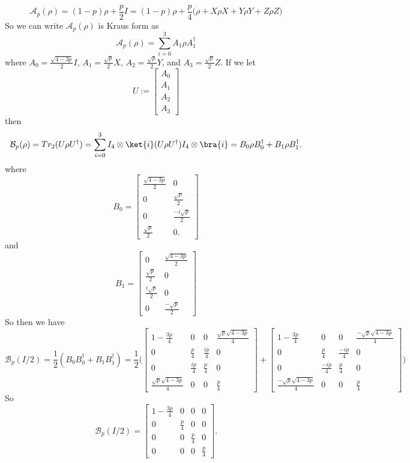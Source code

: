 \documentclass[letterpaper,12pt,oneside,onecolumn]{article}
\newcommand{\cA}{\mathcal{A}} \newcommand{\cB}{\mathcal{B}}
\begin{document}
\paragraph{}
$$\cA_p(\rho) = (1-p)\rho + \frac{p}{2}I  = (1-p)\rho + \frac{p}{4}\big( \rho + X\rho X + Y\rho Y + Z \rho Z\big)$$
So we can write $\cA_p(\rho)$ is Kraus form as
$$\cA_p(\rho)= \sum_{i=0}^3 A_1 \rho A_1^\dagger$$
where $A_0 = \frac{\sqrt{4-3p}}{2}I$, $A_1 = \frac{\sqrt{p}}{2}X$, $A_2= \frac{\sqrt{p}}{2}Y$, and $A_3 = \frac{\sqrt{p}}{2}Z$. If we let 
$$U := \begin{bmatrix}
A_0\\ A_1 \\ A_2\\ A_3
\end{bmatrix}$$
then 
$$\cB_p(\rho) = Tr_2(U\rho U^\dagger) = \sum_{i=0}^3I_4 \otimes \ket{i}(U\rho U^\dagger)I_4\otimes\bra{i} = B_0 \rho B_0^\dagger + B_1\rho B_1^\dagger.$$
where
$$B_0 = \begin{bmatrix}
\frac{\sqrt{4-3p}}{2} & 0 \\
0 & \frac{\sqrt{p}}{2} \\
0 & \frac{-i\sqrt{p}}{2} \\
\frac{\sqrt{p}}{2} & 0.
\end{bmatrix}$$
and
$$B_1 = \begin{bmatrix}
0 & \frac{\sqrt{4-3p}}{2} \\
\frac{\sqrt{p}}{2} & 0 \\
\frac{i\sqrt{p}}{2} & 0 \\
0 & \frac{-\sqrt{p}}{2}
\end{bmatrix}$$
So then we have
$$\cB_p(I/2) = \frac{1}{2}(B_0 B_0^\dagger + B_1 B_1^\dagger) = \frac{1}{2}\big(\begin{bmatrix}
1-\frac{3p}{4} & 0 & 0 & \frac{\sqrt{p}\sqrt{4-3p}}{4} \\
0 & \frac{p}{4} & \frac{ip}{4} & 0 \\
0 & \frac{ip}{4} & \frac{p}{4} & 0 \\
 \frac{\sqrt{p}\sqrt{4-3p}}{4} & 0 & 0 & \frac{p}{4}
\end{bmatrix} + \begin{bmatrix}
1-\frac{3p}{4} & 0 & 0 & \frac{-\sqrt{p}\sqrt{4-3p}}{4} \\
0 &  \frac{p}{4} & \frac{-ip}{4} & 0 \\
0 & \frac{-ip}{4} & \frac{p}{4} & 0 \\
\frac{-\sqrt{p}\sqrt{4-3p}}{4} & 0 & 0 & \frac{p}{4}
\end{bmatrix}\big)$$
So
$$\cB_p(I/2) = \begin{bmatrix}
1-\frac{3p}{4} & 0 & 0 & 0 \\
0 & \frac{p}{4} & 0 & 0 \\
0 & 0 & \frac{p}{4} & 0 \\
0 & 0 & 0 & \frac{p}{4}
\end{bmatrix}.$$
\end{document}

